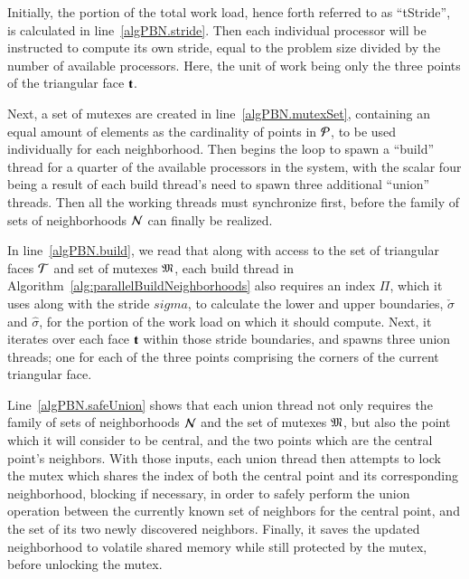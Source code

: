 Initially, the portion of the total work load, hence forth referred to as ``\gls{tStride}'', is calculated in line~\ref{algPBN.stride}. Then each individual processor will be instructed to compute its own stride, equal to the problem size divided by the number of available processors. Here, the unit of work being only the three points of the triangular face $\mathbf{t}$. 

Next, a set of mutexes are created in line~\ref{algPBN.mutexSet}, containing an equal amount of elements as the cardinality of points in $\mathcal{P}$, to be used individually for each neighborhood. Then begins the loop to spawn a ``build'' thread for a quarter of the available processors in the system, with the scalar four being a result of each build thread's need to spawn three additional ``union'' threads. Then all the working threads must synchronize first, before the family of sets of neighborhoods $\mathcal{N}$ can finally be realized.

In line~\ref{algPBN.build}, we read that along with access to the set of triangular faces $\mathcal{T}$ and set of mutexes $\mathfrak{M}$, each build thread in Algorithm~\ref{alg:parallelBuildNeighborhoods} also requires an index $\Pi$, which it uses along with the stride $sigma$, to calculate the lower and upper boundaries, $\check{\sigma}$ and $\hat{\sigma}$, for the portion of the work load on which it should compute. Next, it iterates over each face $\mathbf{t}$ within those stride boundaries, and spawns three union threads; one for each of the three points comprising the corners of the current triangular face.

Line~\ref{algPBN.safeUnion} shows that each union thread not only requires the family of sets of neighborhoods $\mathcal{N}$ and the set of mutexes $\mathfrak{M}$, but also the point which it will consider to be central, and the two points which are the central point's neighbors. With those inputs, each union thread then attempts to lock the mutex which shares the index of both the central point and its corresponding neighborhood, blocking if necessary, in order to safely perform the union operation between the currently known set of neighbors for the central point, and the set of its two newly discovered neighbors. Finally, it saves the updated neighborhood to volatile shared memory while still protected by the mutex, before unlocking the mutex.

